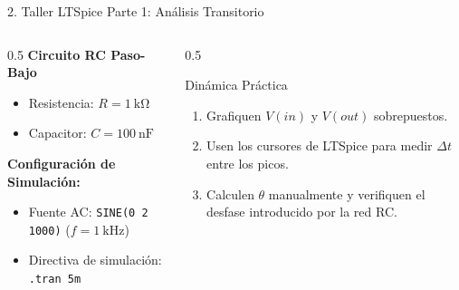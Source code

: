 \documentclass[aspectratio=169, 10pt]{beamer}
\begin{document}
\begin{frame}{2. Taller LTSpice Parte 1: Análisis Transitorio}
    \begin{columns}[T]
        \begin{column}{0.5\textwidth}
            \textbf{Circuito RC Paso-Bajo}
            \begin{itemize}
                \item Resistencia: $R = \SI{1}{\kilo\ohm}$
                \item Capacitor: $C = \SI{100}{\nano\farad}$
            \end{itemize}
            \vspace{0.3cm}
            \textbf{Configuración de Simulación:}
            \begin{itemize}
                \item Fuente AC: \texttt{SINE(0 2 1000)} ($f = \SI{1}{\kilo\hertz}$)
                \item Directiva de simulación: \texttt{.tran 5m}
            \end{itemize}
        \end{column}
        \begin{column}{0.5\textwidth}
            \begin{alertblock}{Dinámica Práctica}
                \begin{enumerate}
                    \item Grafiquen $V(in)$ y $V(out)$ sobrepuestos.
                    \item Usen los cursores de LTSpice para medir $\Delta t$ entre los picos.
                    \item Calculen $\theta$ manualmente y verifiquen el desfase introducido por la red RC.
                \end{enumerate}
            \end{alertblock}
        \end{column}
    \end{columns}
\end{frame}
\end{document}
